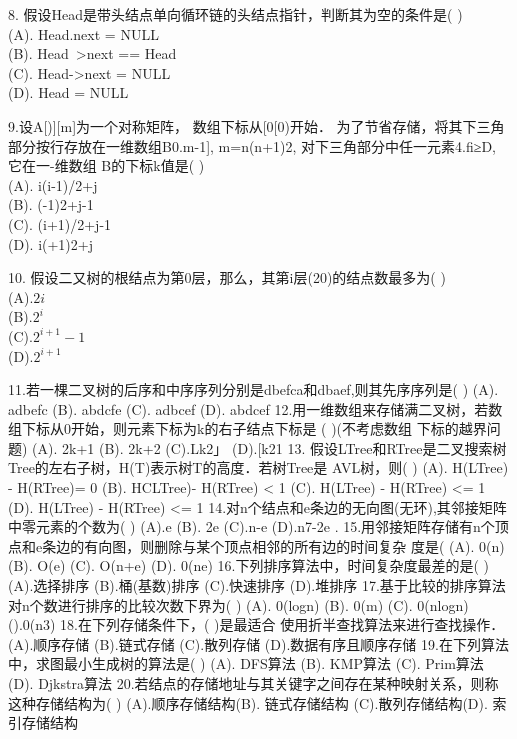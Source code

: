 8. 假设Head是带头结点单向循环链的头结点指针，判断其为空的条件是( ) \\
(A). Head.next = NULL \\
(B). Head~>next == Head \\
(C). Head->next = NULL \\
(D). Head = NULL

9.设A[)][m]为一个对称矩阵， 数组下标从[0[0)开始． 为了节省存储，将其下三角部分按行存放在一维数组B0.m-1], m=n(n+1)2, 对下三角部分中任一元素4.fi≥D, 它在一-维数组 B的下标k值是( ) \\
(A). i(i-1)/2+j \\
(B). (-1)2+j-1 \\
(C). (i+1)/2+j-1 \\
(D). i(+1)2+j

10. 假设二又树的根结点为第0层，那么，其第i层(20)的结点数最多为( ) \\
(A).$2i$ \\
(B).$2^i$ \\
(C).$2^{i+1}-1$ \\
(D).$2^{i+1}$

11.若一棵二叉树的后序和中序序列分别是dbefca和dbaef,则其先序序列是( )
(A). adbefc
(B). abdcfe
(C). adbcef
(D). abdcef
12.用一维数组来存储满二叉树，若数组下标从0开始，则元素下标为k的右子结点下标是
( )(不考虑数组 下标的越界问题)
(A). 2k+1
(B). 2k+2
(C).Lk2」
(D).[k21
13. 假设LTree和RTree是二叉搜索树Tree的左右子树，H(T)表示树T的高度．若树Tree是
AVL树，则( )
(A). H(LTree) - H(RTree)= 0
(B). HCLTree)- H(RTree) < 1
(C). H(LTree) - H(RTree) <= 1
(D). H(LTree) - H(RTree) <= 1
14.对n个结点和e条边的无向图(无环),其邻接矩阵中零元素的个数为( )
(A).e
(B). 2e 
(C).n-e
(D).n7-2e .
15.用邻接矩阵存储有n个顶点和e条边的有向图，则删除与某个顶点相邻的所有边的时间复杂
度是(\)
(A). 0(n)
(B). O(e)
(C). O(n+e)
(D). 0(ne)
16.下列排序算法中，时间复杂度最差的是( )
(A).选择排序
(B).桶(基数)排序
(C).快速排序
(D).堆排序
17.基于比较的排序算法对n个数进行排序的比较次数下界为( )
(A). 0(logn)
(B). 0(m) 
(C). 0(nlogn)
().0(n3)
18.在下列存储条件下，( )是最适合 使用折半查找算法来进行查找操作．
(A).顺序存储
(B).链式存储
(C).散列存储
(D).数据有序且顺序存储
19.在下列算法中，求图最小生成树的算法是( )
(A). DFS算法
(B). KMP算法
(C). Prim算法
(D). Djkstra算法
20.若结点的存储地址与其关键字之间存在某种映射关系，则称这种存储结构为( )
(A).顺序存储结构(B). 链式存储结构
(C).散列存储结构(D). 索引存储结构
